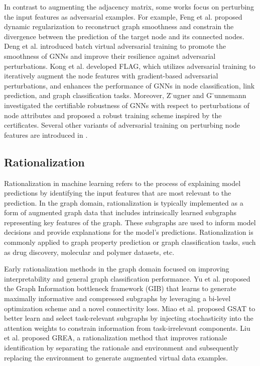 \documentclass[acmsmall,natbib=false]{acmart}
\begin{document}
In contrast to augmenting the adjacency matrix, some works focus on perturbing the input features as adversarial examples. For example, Feng et al. \cite{25} proposed dynamic regularization to reconstruct graph smoothness and constrain the divergence between the prediction of the target node and its connected nodes. Deng et al. \cite{20} introduced batch virtual adversarial training to promote the smoothness of GNNs and improve their resilience against adversarial perturbations. Kong et al. \cite{57} developed FLAG, which utilizes adversarial training to iteratively augment the node features with gradient-based adversarial perturbations, and enhances the performance of GNNs in node classification, link prediction, and graph classification tasks. Moreover, Z ̈ugner and G ̈unnemann \cite{145} investigated the certifiable robustness of GNNs with respect to perturbations of node attributes and proposed a robust training scheme inspired by the certificates. Several other variants of adversarial training on perturbing node features are introduced in \cite{41, 103}.

\subsection{Rationalization}
Rationalization in machine learning refers to the process of explaining model predictions by identifying the input features that are most relevant to the prediction. In the graph domain, rationalization is typically implemented as a form of augmented graph data that includes intrinsically learned subgraphs representing key features of the graph. These subgraphs are used to inform model decisions and provide explanations for the model's predictions. Rationalization is commonly applied to graph property prediction or graph classification tasks, such as drug discovery, molecular and polymer datasets, etc.

Early rationalization methods in the graph domain focused on improving interpretability and general graph classification performance. Yu et al. \cite{121} proposed the Graph Information bottleneck framework (GIB) that learns to generate maximally informative and compressed subgraphs by leveraging a bi-level optimization scheme and a novel connectivity loss. Miao et al. \cite{73} proposed GSAT to better learn and select task-relevant subgraphs by injecting stochasticity into the attention weights to constrain information from task-irrelevant components. Liu et al. \cite{64} proposed GREA, a rationalization method that improves rationale identification by separating the rationale and environment and subsequently replacing the environment to generate augmented virtual data examples.
\end{document}
